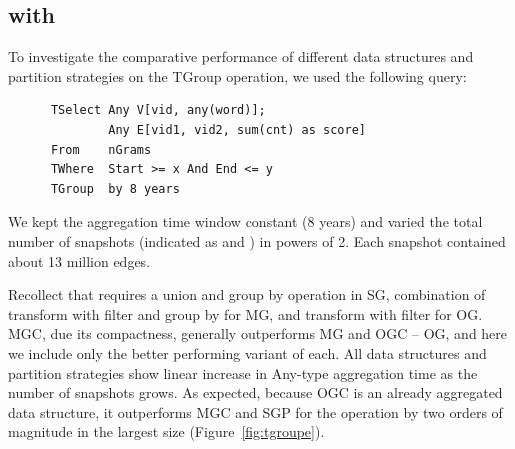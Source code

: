 \subsection{ with }

To investigate the comparative performance of different data
structures and partition strategies on the TGroup operation, we used
the following query:

\begin{small}
\begin{verbatim}
      TSelect Any V[vid, any(word)];
              Any E[vid1, vid2, sum(cnt) as score]
      From    nGrams
      TWhere  Start >= x And End <= y
      TGroup  by 8 years
\end{verbatim}
\end{small}

We kept the aggregation time window constant (8 years) and varied the
total number of snapshots (indicated as  and ) in
powers of 2.  Each snapshot contained about 13 million edges.

Recollect that  requires a union and group by operation
in SG, combination of transform with filter and group by for MG, and
transform with filter for OG.  MGC, due its compactness, generally
outperforms MG and OGC -- OG, and here we include only the better
performing variant of each.  All data structures and partition
strategies show linear increase in Any-type aggregation time as the
number of snapshots grows.  As expected, because OGC is an already
aggregated data structure, it outperforms MGC and SGP for the
 operation by two orders of magnitude in the largest
size (Figure~\ref{fig:tgroupe}).

